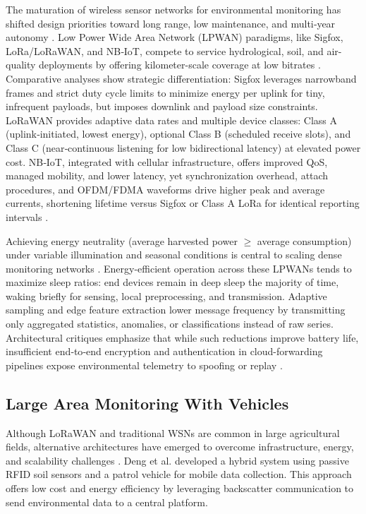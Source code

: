 \documentclass[conference]{IEEEtran}
\begin{document}
The maturation of wireless sensor networks for environmental monitoring has shifted design priorities toward long range, low maintenance, and multi‑year autonomy \cite{pule_2017_wireless}. Low Power Wide Area Network (LPWAN) paradigms, like Sigfox, LoRa/LoRaWAN, and NB‑IoT, compete to service hydrological, soil, and air-quality deployments by offering kilometer-scale coverage at low bitrates \cite{mekki_2019_a}. Comparative analyses show strategic differentiation: Sigfox leverages narrowband frames and strict duty cycle limits to minimize energy per uplink for tiny, infrequent payloads, but imposes downlink and payload size constraints. LoRaWAN provides adaptive data rates and multiple device classes: Class A (uplink‑initiated, lowest energy), optional Class B (scheduled receive slots), and Class C (near‑continuous listening for low bidirectional latency) at elevated power cost. NB‑IoT, integrated with cellular infrastructure, offers improved QoS, managed mobility, and lower latency, yet synchronization overhead, attach procedures, and OFDM/FDMA waveforms drive higher peak and average currents, shortening lifetime versus Sigfox or Class A LoRa for identical reporting intervals \cite{mekki_2019_a}.

Achieving energy neutrality (average harvested power $\geq$ average consumption) under variable illumination and seasonal conditions is central to scaling dense monitoring networks \cite{shaikh_2016_energy}. Energy-efficient operation across these LPWANs tends to maximize sleep ratios: end devices remain in deep sleep the majority of time, waking briefly for sensing, local preprocessing, and transmission. Adaptive sampling and edge feature extraction lower message frequency by transmitting only aggregated statistics, anomalies, or classifications instead of raw series. Architectural critiques emphasize that while such reductions improve battery life, insufficient end‑to‑end encryption and authentication in cloud-forwarding pipelines expose environmental telemetry to spoofing or replay \cite{pule_2017_wireless}.

\subsection{Large Area Monitoring With Vehicles}

Although LoRaWAN and traditional WSNs are common in large agricultural fields, alternative architectures have emerged to overcome infrastructure, energy, and scalability challenges \cite{yellampalli_2021_wireless}. Deng et al. \cite{deng_2020_novel} developed a hybrid system using passive RFID soil sensors and a patrol vehicle for mobile data collection. This approach offers low cost and energy efficiency by leveraging backscatter communication to send environmental data to a central platform.
\end{document}
